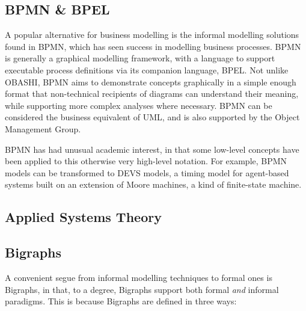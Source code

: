 \documentclass[draft]{article}
\begin{document}
\subsection{BPMN \& BPEL}
\label{subsec:bpmn}
A popular alternative for business modelling is the informal modelling solutions
found in BPMN\cite{bpmn_sources}, which has seen success in modelling business
processes. BPMN is generally a graphical modelling framework, with a language to
support executable process definitions via its companion language,
BPEL\cite{BPEL_SOURCES}. Not unlike OBASHI, BPMN aims to demonstrate concepts
graphically in a simple enough format that non-technical recipients of diagrams
can understand their meaning, while supporting more complex analyses where
necessary. BPMN can be considered the business equivalent of UML, and is also
supported by the Object Management Group\cite{source_for_this_maybe}.\par

BPMN has had unusual academic interest, in that some low-level concepts have
been applied to this otherwise very high-level notation. For example, BPMN
models can be transformed to DEVS models\cite{bazoun2014business}, a timing
model for agent-based systems built on an extension of Moore machines, a kind of
finite-state machine\cite{DEVS}.\par


\subsection{Applied Systems Theory}









\subsection{Bigraphs}
\label{subsubsec:bigraphs}
A convenient segue from informal modelling techniques to formal ones is
Bigraphs, in that, to a degree, Bigraphs support both formal \emph{and} informal
paradigms. This is because Bigraphs are defined in three ways:
\end{document}

